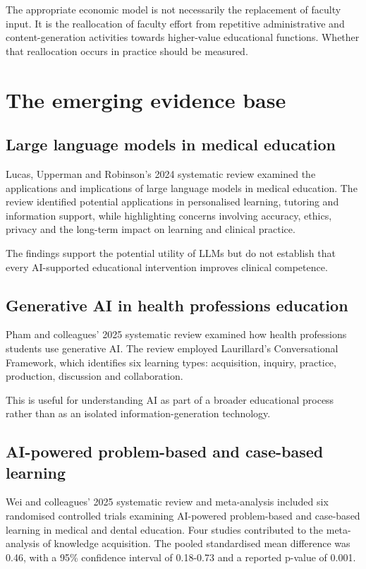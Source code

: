 \documentclass[11pt,a4paper]{article}
\begin{document}
The appropriate economic model is not necessarily the replacement of faculty input. It is the reallocation of faculty effort from repetitive administrative and content-generation activities towards higher-value educational functions. Whether that reallocation occurs in practice should be measured.

\section{The emerging evidence base}
\subsection{Large language models in medical education}
Lucas, Upperman and Robinson's 2024 systematic review examined the applications and implications of large language models in medical education. The review identified potential applications in personalised learning, tutoring and information support, while highlighting concerns involving accuracy, ethics, privacy and the long-term impact on learning and clinical practice.

The findings support the potential utility of LLMs but do not establish that every AI-supported educational intervention improves clinical competence.

\subsection{Generative AI in health professions education}
Pham and colleagues' 2025 systematic review examined how health professions students use generative AI. The review employed Laurillard's Conversational Framework, which identifies six learning types: acquisition, inquiry, practice, production, discussion and collaboration.

This is useful for understanding AI as part of a broader educational process rather than as an isolated information-generation technology.

\subsection{AI-powered problem-based and case-based learning}
Wei and colleagues' 2025 systematic review and meta-analysis included six randomised controlled trials examining AI-powered problem-based and case-based learning in medical and dental education. Four studies contributed to the meta-analysis of knowledge acquisition. The pooled standardised mean difference was 0.46, with a 95\% confidence interval of 0.18-0.73 and a reported p-value of 0.001.
\end{document}
